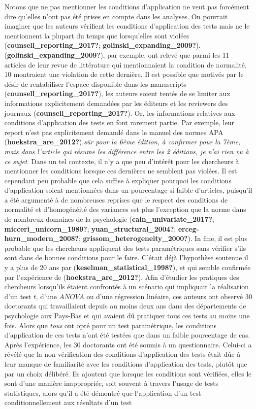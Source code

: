 \documentclass[
  english,
  man]{apa6}
\begin{document}
Notons que ne pas mentionner les conditions d'application ne veut pas forcément dire qu'elles n'ont pas été prises en compte dans les analyses. On pourrait imaginer que les auteurs vérifient les conditions d'application des tests mais ne le mentionnent la plupart du temps que lorsqu'elles sont violées (\textbf{counsell\_reporting\_2017?}; \textbf{golinski\_expanding\_2009?}). (\textbf{golinski\_expanding\_2009?}), par exemple, ont relevé que parmi les 11 articles de leur revue de littérature qui mentionnaient la condition de normalité, 10 montraient une violation de cette dernière. Il est possible que motivés par le désir de rentabiliser l'espace disponible dans les manuscripts (\textbf{counsell\_reporting\_2017?}), les auteurs soient tentés de se limiter aux informations explicitement demandées par les éditeurs et les reviewers des journaux (\textbf{counsell\_reporting\_2017?}). Or, les informations relatives aux conditions d'application des tests en font rarement partie. Par exemple, leur report n'est pas explicitement demandé dans le manuel des normes APA (\textbf{hoekstra\_are\_2012?}).\emph{sûr pour la 6ème édition, à confirmer pour la 7ème, mais dans l'article qui résume les différence entre les 2 éditions, je n'ai rien vu à ce sujet}. Dans un tel contexte, il n'y a que peu d'intérêt pour les chercheurs à mentionner les conditions lorsque ces dernières ne semblent pas violées. Il est cependant peu probable que cela suffise à expliquer pourquoi les conditions d'application soient mentionnées dans un pourcentage si faible d'articles, puisqu'il a été argumenté à de nombreuses reprises que le respect des conditions de normalité et d'homogénéité des variances est plus l'exception que la norme dans de nombreux domaines de la psychologie (\textbf{cain\_univariate\_2017?}; \textbf{micceri\_unicorn\_1989?}; \textbf{yuan\_structural\_2004?}; \textbf{erceg-hurn\_modern\_2008?}; \textbf{grissom\_heterogeneity\_2000?}). In fine, il est plus probable que les chercheurs appliquent des tests paramétriques sans vérifier s'ils sont dans de bonnes conditions pour le faire. C'était déjà l'hypothèse soutenue il y a plus de 20 ans par (\textbf{keselman\_statistical\_1998?}), et qui semble confirmée par l'expérience de (\textbf{hoekstra\_are\_2012?}). Afin d'étudier les pratiques des chercheurs lorsqu'ils étaient confrontés à un scénario qui impliquait la réalisation d'un test \(t\), d'une \(ANOVA\) ou d'une régression linéaire, ces auteurs ont observé 30 doctorants qui travaillaient depuis au moins deux ans dans des départements de psychologie aux Pays-Bas et qui avaient dû pratiquer tous ces tests au moins une fois. Alors que \emph{tous} ont opté pour un test paramétrique, les conditions d'application de ces tests n'ont été testées que dans un faible pourcentage de cas. Après l'expérience, les 30 doctorants ont été soumis à un questionnaire. Celui-ci a révélé que la non vérification des conditions d'application des tests était dûe à leur manque de familiarité avec les conditions d'application des tests, plutôt que par un choix délibéré. Ils ajoutent que lorsque les conditions sont vérifiées, elles le sont d'une manière inappropriée, soit souvent à travers l'usage de tests statistiques, alors qu'il a été démontré que l'application d'un test conditionnellement aux résultats d'un test 
\end{document}
